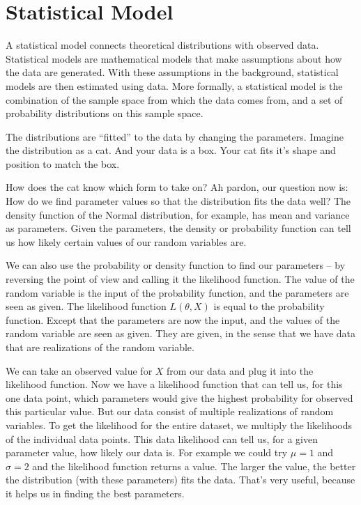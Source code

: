 \documentclass[
  10pt,
]{scrbook}
\begin{document}
\hypertarget{statistical-model}{%
\section{Statistical Model}\label{statistical-model}}

A statistical model connects theoretical distributions with observed data.
Statistical models are mathematical models that make assumptions about how the data are generated.
With these assumptions in the background, statistical models are then estimated using data.
More formally, a statistical model is the combination of the sample space from which the data comes from, and a set of probability distributions on this sample space.

The distributions are ``fitted'' to the data by changing the parameters.
Imagine the distribution as a cat.
And your data is a box.
Your cat fits it's shape and position to match the box.

How does the cat know which form to take on?
Ah pardon, our question now is:
How do we find parameter values so that the distribution fits the data well?
The density function of the Normal distribution, for example, has mean and variance as parameters.
Given the parameters, the density or probability function can tell us how likely certain values of our random variables are.

We can also use the probability or density function to find our parameters -- by reversing the point of view and calling it the likelihood function.
The value of the random variable is the input of the probability function, and the parameters are seen as given.
The likelihood function \(L(\theta, X)\) is equal to the probability function.
Except that the parameters are now the input, and the values of the random variable are seen as given.
They are given, in the sense that we have data that are realizations of the random variable.

We can take an observed value for \(X\) from our data and plug it into the likelihood function.
Now we have a likelihood function that can tell us, for this one data point, which parameters would give the highest probability for observed this particular value.
But our data consist of multiple realizations of random variables.
To get the likelihood for the entire dataset, we multiply the likelihoods of the individual data points.
This data likelihood can tell us, for a given parameter value, how likely our data is.
For example we could try \(\mu = 1\) and \(\sigma = 2\) and the likelihood function returns a value.
The larger the value, the better the distribution (with these parameters) fits the data.
That's very useful, because it helps us in finding the best parameters.
\end{document}
